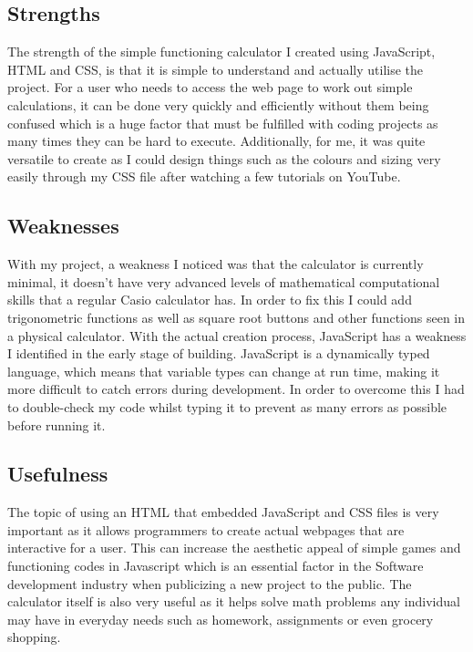 \documentclass[a4paper, 11pt]{report}
\begin{document}
\subsection{Strengths}
The strength of the simple functioning calculator I created using JavaScript, HTML and CSS, is that it is simple to understand and actually utilise the project. For a user who needs to access the web page to work out simple calculations, it can be done very quickly and efficiently without them being confused which is a huge factor that must be fulfilled with coding projects as many times they can be hard to execute. Additionally, for me, it was quite versatile to create as I could design things such as the colours and sizing very easily through my CSS file after watching a few tutorials on YouTube.

\subsection{Weaknesses}
With my project, a weakness I noticed was that the calculator is currently minimal, it doesn't have very advanced levels of mathematical computational skills that a regular Casio calculator has. In order to fix this I could add trigonometric functions as well as square root buttons and other functions seen in a physical calculator. With the actual creation process, JavaScript has a weakness I identified in the early stage of building. JavaScript is a dynamically typed language, which means that variable types can change at run time, making it more difficult to catch errors during development. In order to overcome this I had to double-check my code whilst typing it to prevent as many errors as possible before running it.

\subsection{Usefulness}
The topic of using an HTML that embedded JavaScript and CSS files is very important as it allows programmers to create actual webpages that are interactive for a user. This can increase the aesthetic appeal of simple games and functioning codes in Javascript which is an essential factor in the Software development industry when publicizing a new project to the public. The calculator itself is also very useful as it helps solve math problems any individual may have in everyday needs such as homework, assignments or even grocery shopping. 
\cite{LevelC1}
\end{document}
